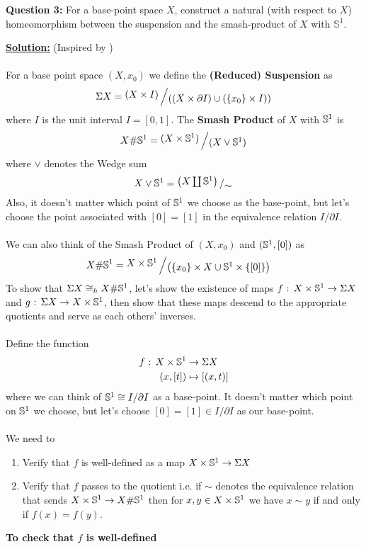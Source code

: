 \documentclass[11pt]{article}
\begin{document}
\begin{bluebox}
  \textbf{Question 3:} For a base-point space $X$, construct a natural (with respect to $X$) homeomorphism between the suspension and the smash-product of $X$ with $\mathbb{S}^1$.
\end{bluebox}

\vskip 0.5cm
\textbf{\underline{Solution:}} (Inspired by \cite{Provost17} )
\\
\\
For a base point space $(X, x_0)$ we define the \textbf{(Reduced) Suspension} as 
\[ \Sigma X = \bigslant{(X \times I)}{((X \times \partial I) \cup (\{x_0\} \times I))} \]
where $I$ is the unit interval $I = [0, 1]$. The \textbf{Smash Product} of $X$ with $\mathbb{S}^1$ is 
\[ X \# \sph^1 = \bigslant{(X \times \sph^1)}{(X \vee \sph^1)} \]
where $\vee$ denotes the Wedge sum
\[ X \vee \sph^1 = \bigslant{\left(X \coprod \sph^1\right)}{\sim} \] Also, it doesn't matter which point of $\mathbb{S}^1$ we choose as the base-point, but let's choose the point associated with $[0] = [1]$ in the equivalence relation $I/\partial I$.
\\
\\
We can also think of the Smash Product of $(X, x_0)$ and $(\mathbb{S}^1, [0])$ as 
\begin{align*}
  X \# \sph^1 &= \bigslant{X \times \sph^1}{\left( \{x_0\} \times X \cup \sph^1 \times \{[0]\}  \right)}
\end{align*} To show that $\Sigma X \cong_{h} X \# \mathbb{S}^1$, let's show the existence of maps $f \text{ : } X \times \mathbb{S}^1  \rightarrow \Sigma X$ and $g \text{ : } \Sigma X \rightarrow X \times \mathbb{S}^1$, then show that these maps descend to the appropriate quotients and serve as each others' inverses.
\\
\\
Define the function 
\begin{align*}
  f \text{ : } X \times \mathbb{S}^1 &\rightarrow \Sigma X \\
                  (x, [t]) &\mapsto [(x, t)] 
\end{align*}
where we can think of $\mathbb{S}^1 \cong I/\partial I$ as a base-point. It doesn't matter which point on $\mathbb{S}^1$ we choose, but let's choose $[0] = [1] \in I/\partial I$ as our base-point.
\\
\\
We need to 
\begin{enumerate}
  \item Verify that $f$ is well-defined as a map $X \times \mathbb{S}^1 \rightarrow \Sigma X$
  \item Verify that $f$ passes to the quotient i.e. if $\sim$ denotes the equivalence relation that sends $X \times \mathbb{S}^1 \rightarrow X \# \mathbb{S}^1$ then for $x,y \in X \times \mathbb{S}^1$ we have $x \sim y$ if and only if $f(x) = f(y)$.
\end{enumerate} \textbf{To check that $f$ is well-defined 
}\\
\end{document}
